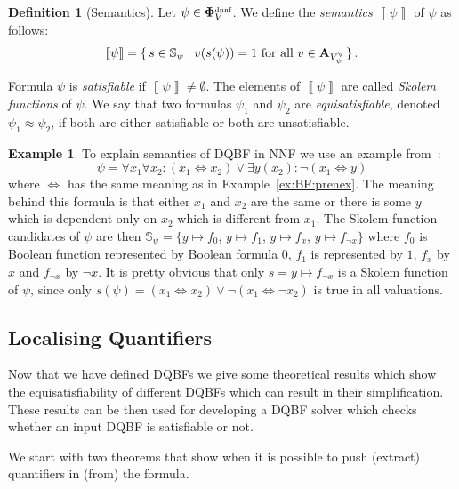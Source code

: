\documentclass[
  digital, %
  twoside, %
  table,   %
  nolof,     %
  nolot,     %
]{fithesis3}
\let\setbuilder\set
\newcommand{\simpleset}[1]{\{{#1}\}}
\renewcommand{\set}[1]{\normalexpandarg\IfSubStr{#1}{|}{\setbuilder{#1}}{\simpleset{#1}}}
\theoremstyle{definition}
\newtheorem{definition}{Definition}
\newtheorem{example}{Example}
\theoremstyle{remark}
\newcommand{\seman}[1]{\left\llbracket {#1} \right\rrbracket}
\newcommand{\DQBF}[1]{\mathbf{\Phi}_{#1}^{\text{\tiny dnnf}}}
\newcommand{\valtns}[1]{\mathbf{A}_{#1}}
\newcommand{\uvars}[1]{V_{#1}^{\forall}}
\newcommand{\Scands}[1]{\mathbb{S}_{#1}}
\newcommand{\lequal}{\Leftrightarrow}
\begin{document}
\begin{definition}[Semantics]
  Let $\psi \in \DQBF{V}$. We define the \emph{semantics} $\seman{\psi}$ of $\psi$ as follows:
  \[\seman{\psi} = \set{s \in \Scands{\psi} | v(s(\psi))=1 \text{ for all } v \in \valtns{\uvars{\psi}}}.\]
\end{definition}
Formula $\psi$ is \emph{satisfiable} if $\seman{\psi} \not= \emptyset$. The elements of $\seman{\psi}$ are called \emph{Skolem functions} of $\psi$. We say that two formulas $\psi_1$ and $\psi_2$ are \emph{equisatisfiable}, denoted $\psi_1 \approx \psi_2$, if both are either satisfiable or both are unsatisfiable.
\begin{example}
\label{ex:DQBF:NNF}
To explain semantics of DQBF in NNF we use an example from~\cite{HQSquantifierLocalization}:
\[\psi = \forall x_1 \forall x_2 : (x_1 \lequal x_2) \lor \exists y (x_2) : \neg(x_1 \lequal y)\]
where ${\lequal}$ has the same meaning as in Example~\ref{ex:BF:prenex}. The meaning behind this formula is that either $x_1$ and $x_2$ are the same or there is some $y$ which is dependent only on $x_2$ which is different from $x_1$. The Skolem function candidates of $\psi$ are then $\Scands{\psi} = \{y\mapsto f_0$, $y\mapsto f_1$, $y\mapsto f_x$, $y\mapsto f_{\neg x}\}$ %
where $f_0$ is Boolean function represented by Boolean formula $0$, $f_1$ is represented by $1$, $f_x$ by $x$ and $f_{\neg x}$ by $\neg x$. It is pretty obvious that only $s = y \mapsto f_{\neg x}$ is a Skolem function of $\psi$, since only $s(\psi) = (x_1 \lequal x_2) \lor \neg(x_1 \lequal \neg x_2)$ is true in all valuations.
\end{example}

\subsection{Localising Quantifiers}
\label{sec:quantLocalization}
Now that we have defined DQBFs we give some theoretical results which show the equisatisfiability of different DQBFs which can result in their simplification. These results can be then used for developing a DQBF solver which checks whether an input DQBF is satisfiable or not.

We start with two theorems that show when it is possible to push (extract) quantifiers in (from) the formula. %
\end{document}
